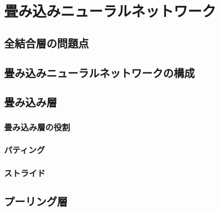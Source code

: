 \chapter{畳み込みニューラルネットワーク}

\section{全結合層の問題点}

\section{畳み込みニューラルネットワークの構成}

\section{畳み込み層}

\subsection{畳み込み層の役割}

\subsection{パティング}

\subsection{ストライド}

\section{プーリング層}
